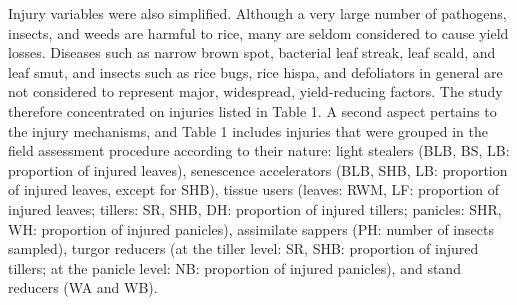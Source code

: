 Injury variables were also simplified. Although a very large number of pathogens, insects, and weeds are harmful to rice, many are seldom considered to cause yield losses. Diseases such as narrow brown spot, bacterial leaf streak, leaf scald, and leaf smut, and insects such as rice bugs, rice hispa, and defoliators in general are not considered to represent major, widespread, yield-reducing factors. The study therefore concentrated on injuries listed in Table 1. A second aspect pertains to the injury mechanisms, and Table 1 includes injuries that were grouped in the field assessment procedure according to their nature: light stealers (BLB, BS, LB: proportion of injured leaves), senescence accelerators (BLB, SHB, LB: proportion of injured leaves, except for SHB), tissue users (leaves: RWM, LF: proportion of injured leaves; tillers: SR, SHB, DH: proportion of injured tillers; panicles: SHR, WH: proportion of injured panicles), assimilate sappers (PH: number of insects sampled), turgor reducers (at the tiller level: SR, SHB: proportion of injured tillers; at the panicle level: NB: proportion of injured panicles), and stand reducers (WA and WB).